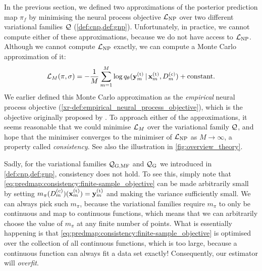 \documentclass[12pt, twoside]{report}
\newcommand{\xrprefix}[1]{xr-#1}
\begin{document}
In the previous section, we defined two approximations of the posterior prediction map $\pi_f$ by minimising the neural process objective $\L\ss{NP}$ over two different variational families $\mathcal{Q}$ (\cref{def:cnp,def:gnp}).
Unfortunately, in practice, we cannot compute either of these approximations, because we do not have access to $\L\ss{NP}$.
Although we cannot compute $\L\ss{NP}$ exactly, we can compute a Monte Carlo approximation of it: 
\begin{equation} \label{eq:predmap:consistency:finite-sample_objective}
    \L_M(\pi, \sigma) = -\frac1M\sum_{m=1}^M \log q_\theta(\vy\us{(t)}_m \cond \vx\us{(t)}_m, D\us{(c)}_m) + \text{constant}.
\end{equation}
We earlier defined this Monte Carlo approximation as the \emph{empirical} neural process objective (\cref{\xrprefix{def:empirical_neural_process_objective}}),
which is the objective originally proposed by \textcite{Garnelo:2018:Conditional_Neural_Processes}.
To approach either of the approximations,
it seems reasonable that we could minimise $\mathcal{L}_M$ over the variational family $\mathcal{Q}$, and hope that the minimiser converges to the minimiser of $\L\ss{NP}$ as $M \to \infty$, a property called \emph{consistency}.
See also the illustration in \cref{fig:overview_theory}.

Sadly, for the variational families $\Qc\ss{G,MF}$ and $\Qc\ss{G}$ we introduced in \cref{def:cnp,def:gnp}, consistency does not hold.
To see this, simply note that \eqref{eq:predmap:consistency:finite-sample_objective} can be made arbitrarily small by setting $m_\pi(D\us{(c)}_m)(\vx_m\us{(t)}) = \vy_m\us{(t)}$ and making the variance sufficiently small.
We can always pick such $m_\pi$, because the variational families require $m_\pi$ to only be continuous and map to continuous functions, which means that we can arbitrarily choose the value of $m_\pi$ at any finite number of points.
What is essentially happening is that \eqref{eq:predmap:consistency:finite-sample_objective} is optimised over the collection of all continuous functions, which is too large, because a continuous function can always fit a data set exactly!
Consequently, our estimator will \emph{overfit}.
\end{document}
